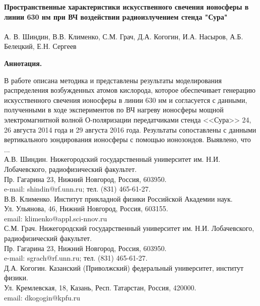 \documentclass[12pt,a4paper]{article}
\begin{document}
\begin{center}
	{\large \textbf{Пространственные характеристики искусственного свечения ионосферы в линии 630 нм при ВЧ воздействии радиоизлучением стенда "Сура"}}\\\ \\
	
	А. В. Шиндин, В.В. Клименко, С.М. Грач, Д.А. Когогин, И.А. Насыров, А.Б. Белецкий, Е.Н. Сергеев\\	

\end{center}

\textbf{Аннотация.}
 
В работе описана методика и представлены результаты моделирования распределения возбужденных атомов кислорода, которое обеспечивает генерацию искусственного свечения ионосферы в линии 630 нм и согласуется с данными, полученными в ходе экспериментов по ВЧ нагреву ионосферы мощной электромагнитной волной О-поляризации передатчиками стенда <<Сура>> 24, 26 августа 2014 года и 29 августа 2016 года. Результаты сопоставлены с данными вертикального зондирования ионосферы с помощью ионозондов. Выявлено, что ... \\

А.В. Шиндин. Нижегородский государственный университет им. Н.И. Лобачевского,
радиофизический факультет.\\
Пр. Гагарина 23, Нижний Новгород, Россия, 603950.\\
e-mail: shindin@rf.unn.ru; тел. (831) 465-61-27.\\

В.В. Клименко. Институт прикладной физики Российской Академии наук.\\
Ул. Ульянова, 46, Нижний Новгород, Россия, 603155.\\
email: klimenko@appl.sci-nnov.ru\\

С.М. Грач. Нижегородский государственный университет им. Н.И.
Лобачевского, радиофизический факультет.\\
Пр. Гагарина 23, Нижний Новгород, Россия, 603950.\\
e-mail: sgrach@rf.unn.ru; тел. (831) 465-61-27.\\

Д.А. Когогин. Казанский (Приволжский) федеральный университет, институт физики.\\
Ул. Кремлевская, 18, Казань, Респ. Татарстан, Россия, 420000.\\
email: dkogogin@kpfu.ru\\
\end{document}
